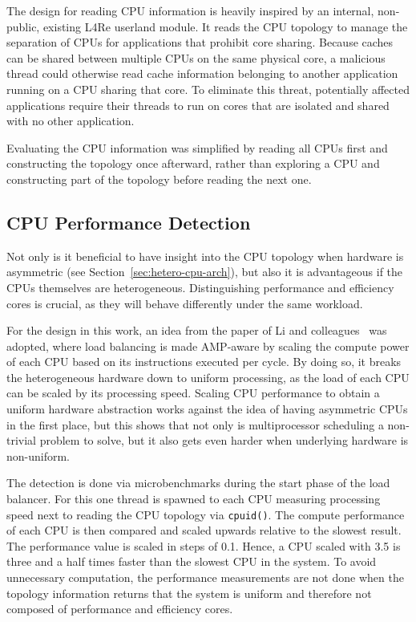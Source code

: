 The design for reading CPU information is heavily inspired by an internal, non-public, existing L4Re userland module.
It reads the CPU topology to manage the separation of CPUs for applications that prohibit core sharing.
Because caches can be shared between multiple CPUs on the same physical core, a malicious thread could otherwise read cache information belonging to another application running on a CPU sharing that core.
To eliminate this threat, potentially affected applications require their threads to run on cores that are isolated and shared with no other application.

Evaluating the CPU information was simplified by reading all CPUs first and constructing the topology once afterward, rather than exploring a CPU and constructing part of the topology before reading the next one.

\subsection{CPU Performance Detection}
\label{sec:cpu-performance}

Not only is it beneficial to have insight into the CPU topology when hardware is asymmetric (see Section~\ref{sec:hetero-cpu-arch}), but also it is advantageous if the CPUs themselves are heterogeneous.
Distinguishing performance and efficiency cores is crucial, as they will behave differently under the same workload.

For the design in this work, an idea from the paper of Li and colleagues~\cite{faster-core-first} was adopted, where load balancing is made AMP-aware by scaling the compute power of each CPU based on its instructions executed per cycle.
By doing so, it breaks the heterogeneous hardware down to uniform processing, as the load of each CPU can be scaled by its processing speed.
Scaling CPU performance to obtain a uniform hardware abstraction works against the idea of having asymmetric CPUs in the first place, but this shows that not only is multiprocessor scheduling a non-trivial problem to solve, but it also gets even harder when underlying hardware is non-uniform.

The detection is done via microbenchmarks during the start phase of the load balancer.
For this one thread is spawned to each CPU measuring processing speed next to reading the CPU topology via \texttt{cpuid()}.
The compute performance of each CPU is then compared and scaled upwards relative to the slowest result.
The performance value is scaled in steps of 0.1.
Hence, a CPU scaled with 3.5 is three and a half times faster than the slowest CPU in the system.
To avoid unnecessary computation, the performance measurements are not done when the topology information returns that the system is uniform and therefore not composed of performance and efficiency cores.


